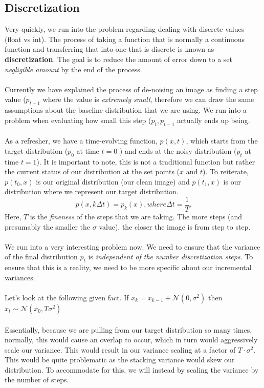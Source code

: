 \documentclass[10pt, oneside]{report}
\begin{document}
\subsection{Discretization}
Very quickly, we run into the problem regarding dealing with discrete values (float vs int). The process of taking a function that is normally a continuous function and transferring that into one that is discrete is known as \textbf{discretization}. The goal is to reduce the amount of error down to a set \textit{negligible amount} by the end of the process.  
\\
\\
Currently we have explained the process of de-noising an image as finding a step value ($p_{t-1}$ where the value is \textit{extremely small}, therefore we can draw the same assumptions about the baseline distribution that we are using.  We run into a problem when evaluating how small this step ($p_t, p_{t-1}$ actually ends up being.  
\\
\\
As a refresher, we have a time-evolving function, $p(x, t)$, which starts from the target distribution ($p_0$ at time $t = 0$ ) and ends at the noisy distribution ($p_t$ at time $t = 1$).  It is important to note, this is not a traditional function but rather the current status of our distribution at the set points ($x$ and $t$).  To reiterate, $p(t_0, x)$ is our original distribution (our clean image) and $p(t_1, x)$ is our distribution where we represent our target distribution.
 \[
p(x, k\Delta t) = p_k(x), where \Delta t = \frac{1}{T}
.\] 
Here, $T$ is the \textit{fineness} of the steps that we are taking.  The more steps (and presumably the smaller the $\sigma$ value), the closer the image is from step to step.
\\
\\
We run into a very interesting problem now. We need to ensure that the variance of the final distribution $p_t$ is \textit{independent of the number discretization steps}.  To ensure that this is a reality, we need to be more specific about our incremental variances. 
\\
\\
Let's look at the following given fact.  If $x_k = x_{k-1} + \mathcal{N}(0, \sigma^2)$ then $x_t \sim \mathcal{N}(x_0, T\sigma^2)$
\\
\\
Essentially, because we are pulling from our target distribution so many times, normally, this would cause an overlap to occur, which in turn would aggressively scale our variance.  This would result in our variance scaling at a factor of $T \cdot \sigma^2$.  This would be quite problematic as the stacking variance would skew our distribution.  To accommodate for this, we will instead by scaling the variance by the number of steps. 
\end{document}
